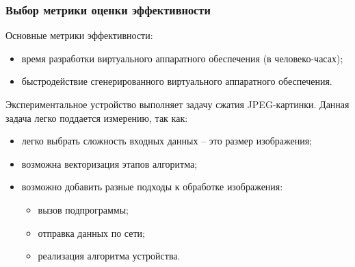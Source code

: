 \begin{frame}%
    \frametitle{Выбор метрики оценки эффективности}
    Основные метрики эффективности:
    \begin{itemize}
        \item время разработки виртуального аппаратного обеспечения (в человеко-часах);
        \item быстродействие сгенерированного виртуального аппаратного обеспечения.
    \end{itemize}


    Экспериментальное устройство выполняет задачу сжатия JPEG-картинки.
    Данная задача легко поддается измерению, так как:
    \begin{itemize}
        \item легко выбрать сложность входных данных -- это
            размер изображения;
        \item возможна векторизация этапов алгоритма;
        \item возможно добавить разные подходы к обработке
            изображения:
            \begin{itemize}
                \item вызов подпрограммы;
                \item отправка данных по сети;
                \item реализация алгоритма устройства.
            \end{itemize}
    \end{itemize}
\end{frame}


